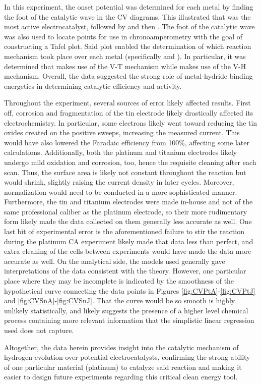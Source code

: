 \documentclass[../labs.tex]{subfiles}
\begin{document}
In this experiment, the onset potential was determined for each metal by finding the foot of the catalytic wave in the CV diagrams. This illustrated that  was the most active electrocatalyst, followed by  and then . The foot of the catalytic wave was also used to locate points for use in chronoamperometry with the goal of constructing a Tafel plot. Said plot enabled the determination of which reaction mechanism took place over each metal (specifically  and ). In particular, it was determined that  makes use of the V-T mechanism while  makes use of the V-H mechanism. Overall, the data suggested the strong role of metal-hydride binding energetics in determining catalytic efficiency and activity.\par
Throughout the experiment, several sources of error likely affected results. First off, corrosion and fragmentation of the tin electrode likely drastically affected its electrochemistry. In particular, some electrons likely went toward reducing the tin oxides created on the positive sweeps, increasing the measured current. This would have also lowered the Faradaic efficiency from 100\%, affecting some later calculations. Additionally, both the platinum and titanium electrodes likely undergo mild oxidation and corrosion, too, hence the requisite cleaning after each scan. Thus, the surface area is likely not constant throughout the reaction but would shrink, slightly raising the current density in later cycles. Moreover, normalization would need to be conducted in a more sophisticated manner. Furthermore, the tin and titanium electrodes were made in-house and not of the same professional caliber as the platinum electrode, so their more rudimentary form likely made the data collected on them generally less accurate as well. One last bit of experimental error is the aforementioned failure to stir the reaction during the platinum CA experiment likely made that data less than perfect, and extra cleaning of the cells between experiments would have made the data more accurate as well. On the analytical side, the models used generally gave interpretations of the data consistent with the theory. However, one particular place where they may be incomplete is indicated by the smoothness of the hypothetical curve connecting the data points in Figures \ref{fig:CVPtA}-\ref{fig:CVPtJ} and \ref{fig:CVSnA}-\ref{fig:CVSnJ}. That the curve would be so smooth is highly unlikely statistically, and likely suggests the presence of a higher level chemical process containing more relevant information that the simplistic linear regression used does not capture.\par
Altogether, the data herein provides insight into the catalytic mechanism of hydrogen evolution over potential electrocatalysts, confirming the strong ability of one particular material (platinum) to catalyze said reaction and making it easier to design future experiments regarding this critical clean energy tool.
\newpage


\printbibliography
\setcounter{figure}{0}
\setcounter{table}{0}
\end{document}
